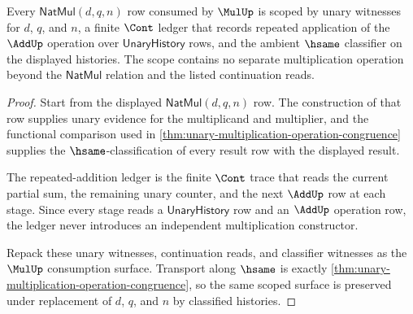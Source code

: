 \begin{theorem}
\label{thm:mulup-repeated-addition-cont-scope}
Every $\mathsf{NatMul}(d,q,n)$ row consumed by $\MulUp$ is scoped by unary
witnesses for $d$, $q$, and $n$, a finite $\Cont$ ledger that records repeated
application of the $\AddUp$ operation over $\mathsf{UnaryHistory}$ rows, and the
ambient $\hsame$ classifier on the displayed histories. The scope contains no
separate multiplication operation beyond the $\mathsf{NatMul}$ relation and the
listed continuation reads.
\end{theorem}
\begin{proof}
Start from the displayed $\mathsf{NatMul}(d,q,n)$ row. The construction of that
row supplies unary evidence for the multiplicand and multiplier, and the
functional comparison used in
\autoref{thm:unary-multiplication-operation-congruence} supplies the
$\hsame$-classification of every result row with the displayed result.

The repeated-addition ledger is the finite $\Cont$ trace that reads the current
partial sum, the remaining unary counter, and the next $\AddUp$ row at each
stage. Since every stage reads a $\mathsf{UnaryHistory}$ row and an $\AddUp$
operation row, the ledger never introduces an independent multiplication
constructor.

Repack these unary witnesses, continuation reads, and classifier witnesses as
the $\MulUp$ consumption surface. Transport along $\hsame$ is exactly
\autoref{thm:unary-multiplication-operation-congruence}, so the same scoped
surface is preserved under replacement of $d$, $q$, and $n$ by classified
histories.
\end{proof}

